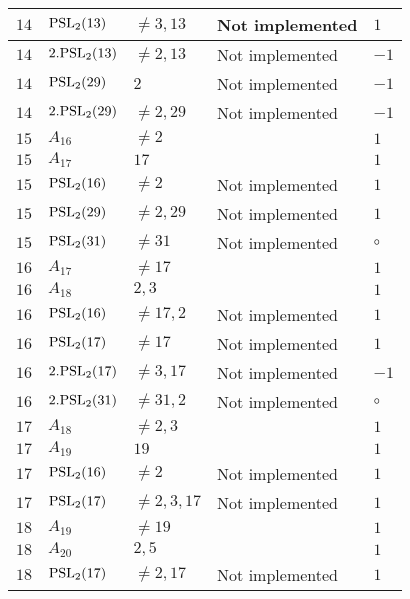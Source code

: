\documentclass[a4paper, 11pt]{article}
\begin{document}
\begin{longtable}{lllll}
        $ 14 $ & $ {\rm PSL}_{2}(13) $ & $ \neq 3, 13 $ & Not implemented & $ 1  $ \\ \hline
        $ 14 $ & $ 2.{\rm PSL}_{2}(13) $ & $ \neq 2, 13 $ & Not implemented & $ -1  $ \\ \hline
        $ 14 $ & $ {\rm PSL}_{2}(29) $ & $ 2 $ & Not implemented & $ -1  $ \\ \hline
        $ 14 $ & $ 2.{\rm PSL}_{2}(29) $ & $ \neq 2, 29 $ & Not implemented & $ -1  $ \\ \hline
        $ 15 $ & $ A_{16} $ & $ \neq 2 $ & $ ~ $ & $ 1  $ \\ \hline
        $ 15 $ & $ A_{17} $ & $ 17 $ & $ ~ $ & $ 1  $ \\ \hline
        $ 15 $ & $ {\rm PSL}_{2}(16) $ & $ \neq 2 $ & Not implemented & $ 1  $ \\ \hline
        $ 15 $ & $ {\rm PSL}_{2}(29) $ & $ \neq 2, 29 $ & Not implemented & $ 1  $ \\ \hline
        $ 15 $ & $ {\rm PSL}_{2}(31) $ & $ \neq 31 $ & Not implemented & $\circ$ \\ \hline
        $ 16 $ & $ A_{17} $ & $ \neq 17 $ & $ ~ $ & $ 1  $ \\ \hline
        $ 16 $ & $ A_{18} $ & $ 2, 3 $ & $ ~ $ & $ 1  $ \\ \hline
        $ 16 $ & $ {\rm PSL}_{2}(16) $ & $ \neq 17, 2 $ & Not implemented & $ 1  $ \\ \hline
        $ 16 $ & $ {\rm PSL}_{2}(17) $ & $ \neq 17 $ & Not implemented & $ 1  $ \\ \hline
        $ 16 $ & $ 2.{\rm PSL}_{2}(17) $ & $ \neq 3, 17 $ & Not implemented & $ -1  $ \\ \hline
        $ 16 $ & $ 2.{\rm PSL}_{2}(31) $ & $ \neq 31, 2 $ & Not implemented & $\circ$ \\ \hline
        $ 17 $ & $ A_{18} $ & $ \neq 2, 3 $ & $ ~ $ & $ 1  $ \\ \hline
        $ 17 $ & $ A_{19} $ & $ 19 $ & $ ~ $ & $ 1  $ \\ \hline
        $ 17 $ & $ {\rm PSL}_{2}(16) $ & $ \neq 2 $ & Not implemented & $ 1  $ \\ \hline
        $ 17 $ & $ {\rm PSL}_{2}(17) $ & $ \neq 2, 3, 17 $ & Not implemented & $ 1  $ \\ \hline
        $ 18 $ & $ A_{19} $ & $ \neq 19 $ & $ ~ $ & $ 1  $ \\ \hline
        $ 18 $ & $ A_{20} $ & $ 2, 5 $ & $ ~ $ & $ 1  $ \\ \hline
        $ 18 $ & $ {\rm PSL}_{2}(17) $ & $ \neq 2, 17 $ & Not implemented & $ 1  $ \\ \hline

\end{longtable}
\end{document}
